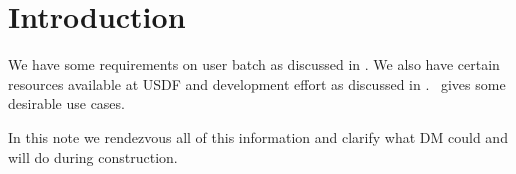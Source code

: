 
\section{Introduction} \label{sec:intro}

We have some requirements on user batch as discussed in .
We also have certain resources available at USDF  and development effort as discussed in .\
 gives some desirable use cases.

In this note we rendezvous all of this information and clarify what DM could and will do during construction.
